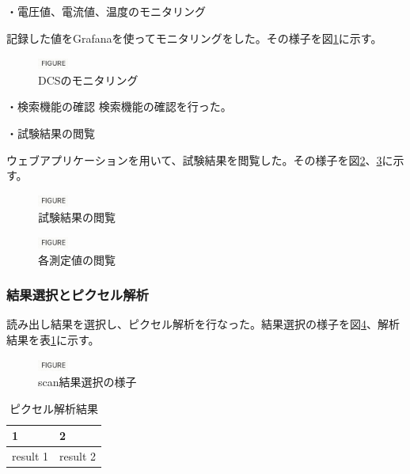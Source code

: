 ・電圧値、電流値、温度のモニタリング

記録した値をGrafanaを使ってモニタリングをした。その様子を図\ref{monitoring_dcs}に示す。

\begin{figure}[bpt]\centering
\includegraphics[width=1cm]{figure}
\caption[DCSのモニタリング]{DCSのモニタリング}
\label{monitoring_dcs}
\end{figure}

・検索機能の確認
検索機能の確認を行った。

・試験結果の閲覧

ウェブアプリケーションを用いて、試験結果を閲覧した。その様子を図\ref{view_scan_result}、\ref{view_dcs}に示す。

\begin{figure}[bpt]\centering
\includegraphics[width=1cm]{figure}
\caption[試験結果の閲覧]{試験結果の閲覧}
\label{view_scan_result}
\end{figure}

\begin{figure}[bpt]\centering
\includegraphics[width=1cm]{figure}
\caption[各測定値の閲覧]{各測定値の閲覧}
\label{view_dcs}
\end{figure}

\subsubsection{結果選択とピクセル解析}
読み出し結果を選択し、ピクセル解析を行なった。結果選択の様子を図\ref{select_scans}、解析結果を表\ref{pixel_analysis_result}に示す。

\begin{figure}[bpt]\centering
\includegraphics[width=1cm]{figure}
\caption[scan結果選択の様子]{scan結果選択の様子}
\label{select_scans}
\end{figure}

\begin{table}[tbp]
\begin{center}
\caption[ピクセル解析結果]{ピクセル解析結果}
\label{pixel_analysis_result}
  \begin{tabular}{|ll|} \hline
    1 & 2 \\ \hline
    result 1 & result 2 \\ \hline 
  \end{tabular}
\end{center}
\end{table}

